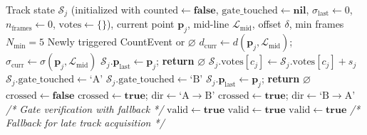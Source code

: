 \begin{algorithm}[t]
\caption{Directional Line Crossing and State Verification}
\label{alg:crossing}
\begin{algorithmic}[1]
\REQUIRE Track state $\mathcal{S}_j$ (initialized with $\text{counted} \leftarrow \mathbf{false}$, $\text{gate\_touched} \leftarrow \mathbf{nil}$, $\sigma_{\text{last}} \leftarrow 0$, $n_{\text{frames}} \leftarrow 0$, $\text{votes} \leftarrow \{\}$), current point $\mathbf{p}_j$, mid-line $\mathcal{L}_{\text{mid}}$, offset $\delta$, min frames $N_{\text{min}} = 5$
\ENSURE Newly triggered CountEvent or $\varnothing$
\STATE $d_{\text{curr}} \leftarrow d(\mathbf{p}_j, \mathcal{L}_{\text{mid}})$; \quad $\sigma_{\text{curr}} \leftarrow \sigma(\mathbf{p}_j, \mathcal{L}_{\text{mid}})$
    \STATE $\mathcal{S}_j.\mathbf{p}_{\text{last}} \leftarrow \mathbf{p}_j$; \quad \textbf{return} $\varnothing$
\ENDIF
\STATE $\mathcal{S}_j.\text{votes}[c_j] \leftarrow \mathcal{S}_j.\text{votes}[c_j] + s_j$
        \STATE $\mathcal{S}_j.\text{gate\_touched} \leftarrow \text{`A'}$
        \STATE $\mathcal{S}_j.\text{gate\_touched} \leftarrow \text{`B'}$
    \ENDIF
\ENDIF
{}
    \STATE $\mathcal{S}_j.\mathbf{p}_{\text{last}} \leftarrow \mathbf{p}_j$; \quad \textbf{return} $\varnothing$
\ENDIF
\STATE $\text{crossed} \leftarrow \mathbf{false}$
        \STATE $\text{crossed} \leftarrow \mathbf{true}$; \quad $\text{dir} \leftarrow \text{`A}\to\text{B'}$
        \STATE $\text{crossed} \leftarrow \mathbf{true}$; \quad $\text{dir} \leftarrow \text{`B}\to\text{A'}$
    \ENDIF
\ENDIF
{}
    \STATE \textit{/* Gate verification with fallback */}
        \STATE $\text{valid} \leftarrow \mathbf{true}$
        \STATE $\text{valid} \leftarrow \mathbf{true}$
        \STATE $\text{valid} \leftarrow \mathbf{true}$ \textit{/* Fallback for late track acquisition */}

\end{algorithmic}
\end{algorithm}

